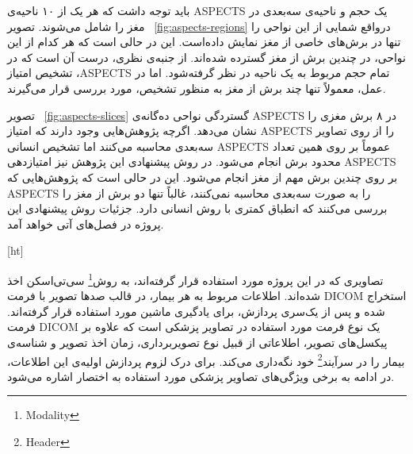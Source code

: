 باید توجه داشت که هر یک از ۱۰ ناحیه‌ی ASPECTS یک حجم و ناحیه‌ی سه‌بعدی در مغز را شامل می‌شوند.
تصویر ~\ref{fig:aspects-regions} درواقع شمایی از این نواحی را تنها در برش‌های خاصی از مغز نمایش داده‌است.
این در حالی است که هر کدام از این نواحی، در چندین برش از مغز گسترده شده‌اند.
از جنبه‌ی نظری، درست آن است که در تشخیص امتیاز ،ASPECTS تمام حجم مربوط به یک ناحیه در نظر گرفته‌شود.
اما در عمل، معمولاً تنها چند برش از مغز به منظور تشخیص، مورد بررسی قرار می‌گیرند.


تصویر ~\ref{fig:aspects-slices}
گستردگی نواحی ده‌گانه‌ی ASPECTS در ۸ برش مغزی را نشان می‌دهد.
اگرچه پژوهش‌هایی وجود دارند که امتیاز ASPECTS را از روی تصاویر سه‌بعدی محاسبه می‌کنند اما تشخیص انسانی ASPECTS عموماً بر روی همین تعداد محدود برش انجام می‌شود.
در روش پیشنهادی این پژوهش نیز امتیازدهی ASPECTS بر روی چندین برش مهم از مغز انجام می‌شود.
این در حالی است که
پژوهش‌هایی که ASPECTS را به صورت سه‌بعدی محاسبه نمی‌کنند، غالباً تنها دو برش از مغز را بررسی می‌کنند
که انطباق کمتری با روش انسانی دارد.
جزئیات روش پیشنهادی این پروژه در فصل‌های آتی خواهد آمد.


[ht]


تصاویری که در این پروژه مورد استفاده قرار گرفته‌اند، به روش\footnote{Modality}
سی‌تی‌اسکن اخذ شده‌اند.
اطلاعات مربوط به هر بیمار، در قالب صدها تصویر با فرمت DICOM استخراج شده و پس از یک‌سری پردازش، برای یادگیری ماشین مورد استفاده قرار گرفته‌اند.
فرمت DICOM یک نوع فرمت مورد استفاده در تصاویر پزشکی است که علاوه بر پیکسل‌های تصویر، اطلاعاتی از قبیل نوع تصویربرداری، زمان اخذ تصویر و شناسه‌ی بیمار را در 
سرآیند\footnote{Header}
خود نگه‌داری می‌کند.
برای درک لزوم پردازش اولیه‌ی این اطلاعات، در ادامه به برخی ویژگی‌های تصاویر پزشکی مورد استفاده به اختصار اشاره می‌شود.

